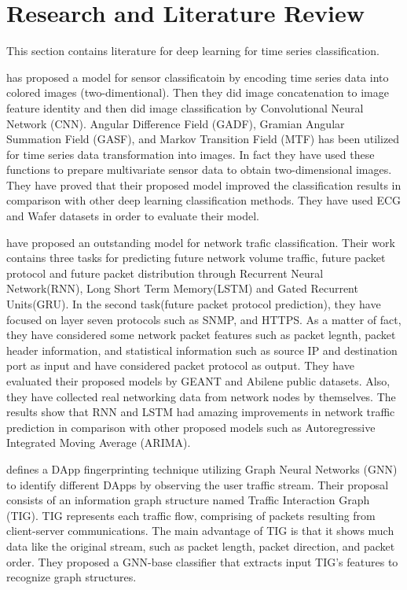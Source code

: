 \documentclass[conference]{IEEEtran}
\begin{document}
\section{Research and Literature Review}
This section contains literature for deep learning for time series classification. 

\cite{b8} has proposed a model for sensor classificatoin by encoding time series data into colored images (two-dimentional). Then they did image concatenation to image feature identity and then did image classification by Convolutional Neural Network (CNN). Angular Difference Field (GADF), Gramian Angular Summation Field (GASF),  and Markov Transition Field (MTF) has been utilized for time series data transformation into images. In fact they have used these functions to prepare multivariate sensor data to obtain two-dimensional images. They have proved that their proposed model improved the classification results in comparison with other deep learning classification methods. They have used ECG and Wafer datasets in order to evaluate their model. 
\par \cite{ramakrishnan2018network} have proposed an outstanding model for network trafic classification. Their work contains three tasks for predicting future network volume traffic, future packet protocol and future packet distribution through Recurrent Neural Network(RNN), Long Short Term Memory(LSTM) and Gated Recurrent Units(GRU). In the second task(future packet protocol prediction), they have focused on layer seven protocols such as SNMP, and HTTPS. As a matter of fact, they have considered some network packet features such as packet legnth, packet header information, and statistical information such as source IP and destination port as input and have considered packet protocol as output. They have evaluated their proposed models by GEANT and Abilene public datasets. Also, they have collected real networking data from network nodes by themselves. The results show that RNN and LSTM had amazing improvements in network traffic prediction in comparison with other proposed models such as Autoregressive Integrated Moving Average (ARIMA).  

\par \cite{shen2021accurate} defines a DApp fingerprinting technique utilizing Graph Neural Networks (GNN) to identify different DApps by observing the user traffic stream. Their proposal consists of an information graph structure named Traffic Interaction Graph (TIG). TIG represents each traffic flow, comprising of packets resulting from client-server communications.  The main advantage of TIG is that it shows much data like the original stream, such as packet length, packet direction, and packet order. They proposed a GNN-base classifier that extracts input TIG's features to recognize graph structures.
\end{document}
